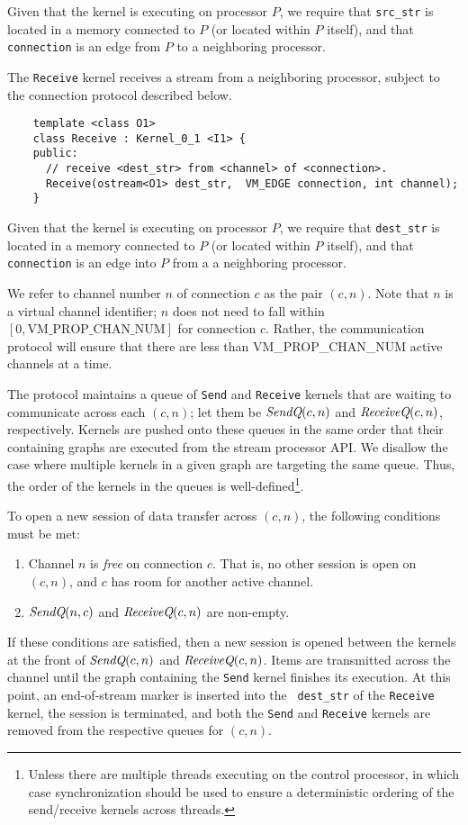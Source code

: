 Given that the kernel is executing on processor $P$, we require that
{\tt src\_str} is located in a memory connected to $P$ (or located
within $P$ itself), and that {\tt connection} is an edge from $P$ to a
neighboring processor.

 The {\tt Receive} kernel receives a stream from a
neighboring processor, subject to the connection protocol described
below.  
{\small
\begin{verbatim}
    template <class O1>
    class Receive : Kernel_0_1 <I1> {
    public:
      // receive <dest_str> from <channel> of <connection>.
      Receive(ostream<O1> dest_str,  VM_EDGE connection, int channel);
    }  
\end{verbatim}}

Given that the kernel is executing on processor $P$, we require that
{\tt dest\_str} is located in a memory connected to $P$ (or located
within $P$ itself), and that {\tt connection} is an edge into $P$ from
a a neighboring processor.

 We refer to channel number $n$ of
connection $c$ as the pair $(c, n)$.  Note that $n$ is a virtual
channel identifier; $n$ does not need to fall within $[0,
\mbox{VM\_PROP\_CHAN\_NUM}]$ for connection $c$.  Rather, the
communication protocol will ensure that there are less than
VM\_PROP\_CHAN\_NUM active channels at a time.

The protocol maintains a queue of {\tt Send} and {\tt Receive} kernels
that are waiting to communicate across each $(c, n)$; let them be
$\mbox{\it SendQ}(c, n)$ and $\mbox{\it ReceiveQ}(c, n)$, respectively.  Kernels
are pushed onto these queues in the same order that their containing
graphs are executed from the stream processor API.  We disallow the
case where multiple kernels in a given graph are targeting the same
queue.  Thus, the order of the kernels in the queues is
well-defined\footnote{Unless there are multiple threads executing on
the control processor, in which case synchronization should be used to
ensure a deterministic ordering of the send/receive kernels across
threads.}.

To open a new session of data transfer across $(c, n)$, the following
conditions must be met:
\begin{enumerate}

\item Channel $n$ is {\it free} on connection $c$.  That is, no other
session is open on $(c, n)$, and $c$ has room for another active
channel.

\item $\mbox{\it SendQ}(n,c)$ and $\mbox{\it ReceiveQ}(c, n)$ are non-empty.

\end{enumerate}
If these conditions are satisfied, then a new session is opened
between the kernels at the front of $\mbox{\it SendQ}(c, n)$ and
$\mbox{\it ReceiveQ}(c, n)$.  Items are transmitted across the channel until
the graph containing the {\tt Send} kernel finishes its execution.  At
this point, an end-of-stream marker is inserted into the {\tt
dest\_str} of the {\tt Receive} kernel, the session is terminated, and
both the {\tt Send} and {\tt Receive} kernels are removed from the
respective queues for $(c, n)$.

